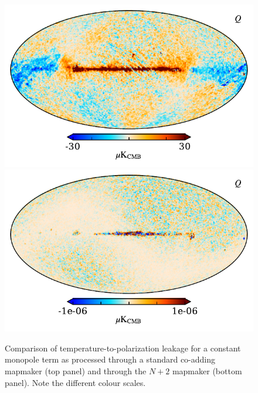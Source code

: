 \documentclass{aa}
\begin{document}
\begin{figure}[]
\includegraphics[width=\linewidth]{figs/map_Q_leak_comp.pdf}\\
\includegraphics[width=\linewidth]{figs/map_Q_leak_nplus2_comp.pdf}
\caption{Comparison of temperature-to-polarization leakage for a constant monopole term as processed through a standard co-adding mapmaker (top panel) and through the $N+2$ mapmaker (bottom panel). Note the different colour scales.}
\label{fig:leak}
\end{figure}
\end{document}
